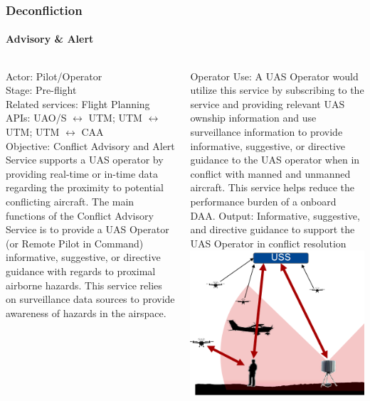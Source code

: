 \documentclass[usenames,dvipsnames,aspectratio=169,serif]{beamer}
\begin{document}
\begin{frame}
   \frametitle{Deconfliction}
   \framesubtitle{Advisory \& Alert}
   \begin{columns}[t]
      \begin{column}{0.5\textwidth}
         Actor: Pilot/Operator \\
         Stage: Pre-flight \\
         Related services: Flight Planning \\
         APIs: UAO/S $\leftrightarrow$ UTM; UTM $\leftrightarrow$ UTM; UTM $\leftrightarrow$ CAA \\
         Objective: Conflict Advisory and Alert Service supports a UAS operator by providing real-time or in-time data regarding the proximity to potential conflicting aircraft. The main functions of the Conflict Advisory Service is to provide a UAS Operator (or Remote Pilot in Command) informative, suggestive, or directive guidance with regards to proximal airborne hazards. This service relies on surveillance data sources to provide awareness of hazards in the airspace.
      \end{column}
      \begin{column}{0.5\textwidth}
         Operator Use: A UAS Operator would utilize this service by subscribing to the service and providing relevant UAS ownship information and use surveillance information to provide informative, suggestive, or directive guidance to the UAS operator when in conflict with manned and unmanned aircraft. This service helps reduce the performance burden of a onboard DAA.
         Output: Informative, suggestive, and directive guidance to support the UAS Operator in conflict resolution \\
         \includegraphics[height=0.45\textwidth]{img/conflict-advisory.png}

      \end{column}
   \end{columns}
\end{frame}
\end{document}
